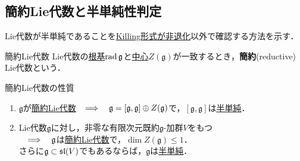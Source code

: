 \documentclass[rep_main]{subfiles}
\begin{document}
\subsection{簡約Lie代数と半単純性判定}
Lie代数が半単純であることを\hyperref[thm:semisimple-LieAlg-iff]{Killing形式が非退化}以外で確認する方法を示す．
\begin{mydef}[label=def:red-Lie-alg]{簡約Lie代数}
	Lie代数の\hyperref[def:rad-LieAlg]{根基}$\operatorname{rad}\mathfrak{g}$と\hyperref[def:center-LieAlg]{中心}$Z(\mathfrak{g})$が一致するとき，\textbf{簡約}(reductive) Lie代数という．
\end{mydef}
\begin{myprop}[label=prop:red-Lie-alg]{簡約Lie代数の性質}
	\begin{enumerate}
		\item $\mathfrak{g}$が\hyperref[def:red-Lie-alg]{簡約Lie代数}$  \quad \Longrightarrow \quad  \mathfrak{g} = [\mathfrak{g}, \mathfrak{g}] \oplus Z(\mathfrak{g})$で，$[\mathfrak{g}, \mathfrak{g}]$は\hyperref[def:semisimple-LieAlg]{半単純}．
		\item Lie代数$\mathfrak{g}$に対し，非零な有限次元既約$\mathfrak{g}$-加群$V$をもつ\\
		$\quad \Longrightarrow \quad  \mathfrak{g}$は\hyperref[def:red-Lie-alg]{簡約Lie代数}で，$\dim Z(\mathfrak{g}) \leq 1$．\\
		さらに$\mathfrak{g} \subset \mathfrak{sl}(V)$でもあるならば，$\mathfrak{g}$は\hyperref[def:semisimple-LieAlg]{半単純}．
	\end{enumerate}
\end{myprop}
\end{document}
